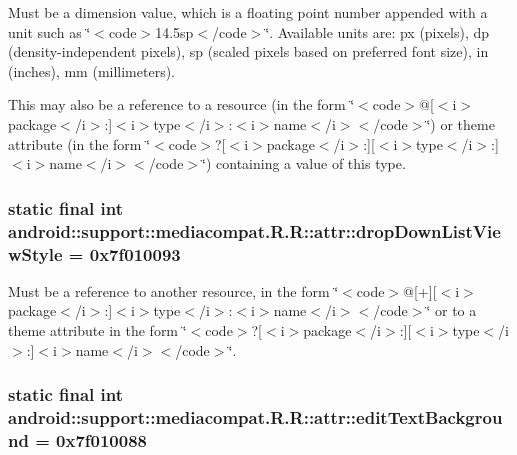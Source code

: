 Must be a dimension value, which is a floating point number appended with a unit such as \char`\"{}$<$code$>$14.5sp$<$/code$>$\char`\"{}. Available units are: px (pixels), dp (density-independent pixels), sp (scaled pixels based on preferred font size), in (inches), mm (millimeters). 

This may also be a reference to a resource (in the form \char`\"{}$<$code$>$@\mbox{[}$<$i$>$package$<$/i$>$:\mbox{]}$<$i$>$type$<$/i$>$:$<$i$>$name$<$/i$>$$<$/code$>$\char`\"{}) or theme attribute (in the form \char`\"{}$<$code$>$?\mbox{[}$<$i$>$package$<$/i$>$:\mbox{]}\mbox{[}$<$i$>$type$<$/i$>$:\mbox{]}$<$i$>$name$<$/i$>$$<$/code$>$\char`\"{}) containing a value of this type. \hypertarget{classandroid_1_1support_1_1mediacompat_1_1_r_1_1attr_a5d7e23e021b5035ef02e158e8dd3950}{
\subsubsection[{dropDownListViewStyle}]{\setlength{\rightskip}{0pt plus 5cm}static final int android::support::mediacompat.R.R::attr::dropDownListViewStyle = 0x7f010093}}
\label{classandroid_1_1support_1_1mediacompat_1_1_r_1_1attr_a5d7e23e021b5035ef02e158e8dd3950}


Must be a reference to another resource, in the form \char`\"{}$<$code$>$@\mbox{[}+\mbox{]}\mbox{[}$<$i$>$package$<$/i$>$:\mbox{]}$<$i$>$type$<$/i$>$:$<$i$>$name$<$/i$>$$<$/code$>$\char`\"{} or to a theme attribute in the form \char`\"{}$<$code$>$?\mbox{[}$<$i$>$package$<$/i$>$:\mbox{]}\mbox{[}$<$i$>$type$<$/i$>$:\mbox{]}$<$i$>$name$<$/i$>$$<$/code$>$\char`\"{}. \hypertarget{classandroid_1_1support_1_1mediacompat_1_1_r_1_1attr_345d2d49ca287838470129ebdba0cefb}{
\subsubsection[{editTextBackground}]{\setlength{\rightskip}{0pt plus 5cm}static final int android::support::mediacompat.R.R::attr::editTextBackground = 0x7f010088}}
\label{classandroid_1_1support_1_1mediacompat_1_1_r_1_1attr_345d2d49ca287838470129ebdba0cefb}


